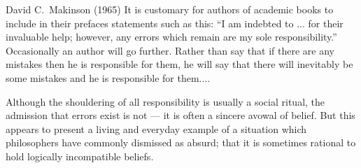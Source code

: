 \begin{wbepi}{David C.~Makinson (1965)}
It is customary for authors of academic books to include in their prefaces statements such as this: ``I am indebted to ... for their invaluable help; however, any errors which remain are my sole responsibility.'' Occasionally an author will go further. Rather than say that if there are any mistakes then he is responsible for them, he will say that there will inevitably be some mistakes and he is responsible for them....

Although the shouldering of all responsibility is usually a social ritual, the admission that errors exist is not --- it is often a sincere avowal of belief. But this appears to present a living and everyday example of a situation which philosophers have commonly dismissed as absurd; that it is sometimes rational to hold logically incompatible beliefs.
\end{wbepi}

